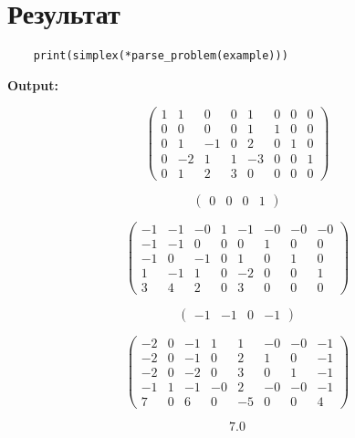 \documentclass{article}
\begin{document}
\section{Результат}
\begin{listing}[H]
    \begin{verbatim}
    print(simplex(*parse_problem(example)))
    \end{verbatim}
\end{listing}

\textbf{Output:}

$$\begin{pmatrix}
1& 1& 0& 0& 1& 0& 0& 0\\
0& 0& 0& 0& 1& 1& 0& 0\\
0& 1&-1& 0& 2& 0& 1& 0\\
0&-2& 1& 1&-3& 0& 0& 1\\
0& 1& 2& 3& 0& 0& 0& 0
\end{pmatrix}$$

$$\begin{pmatrix}
0&0&0&1
\end{pmatrix}$$

$$\begin{pmatrix}
-1&-1&-0& 1&-1&-0&-0&-0\\
-1&-1& 0& 0& 0& 1& 0& 0\\
-1& 0&-1& 0& 1& 0& 1& 0\\
1&-1& 1& 0&-2& 0& 0& 1\\
3& 4& 2& 0& 3& 0& 0& 0
\end{pmatrix}$$

$$\begin{pmatrix}
-1&-1& 0&-1
\end{pmatrix}
$$

$$\begin{pmatrix}
-2& 0&-1& 1& 1&-0&-0&-1\\
-2& 0&-1& 0& 2& 1& 0&-1\\
-2& 0&-2& 0& 3& 0& 1&-1\\
-1& 1&-1&-0& 2&-0&-0&-1\\
7& 0& 6& 0&-5& 0& 0& 4
\end{pmatrix}$$

$$7.0$$
\end{document}
